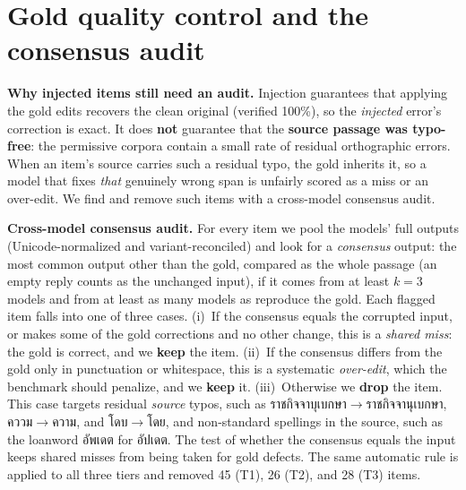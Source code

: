 \documentclass[11pt]{article}
\begin{document}
\section{Gold quality control and the consensus audit}
\label{app:qc}
\textbf{Why injected items still need an audit.} Injection guarantees that applying
the gold edits recovers the clean original (verified 100\%), so the \emph{injected} error's
correction is exact. It does \textbf{not} guarantee that the \textbf{source passage was
typo-free}: the permissive corpora contain a small rate of residual orthographic errors. When
an item's source carries such a residual typo, the gold inherits it, so a model that fixes
\emph{that} genuinely wrong span is unfairly scored as a miss or an over-edit. We find and remove
such items with a cross-model consensus audit.

\textbf{Cross-model consensus audit.} For every item we pool the models' full outputs
(Unicode-normalized and variant-reconciled) and look for a \emph{consensus} output: the most
common output other than the gold, compared as the whole passage (an empty reply counts as the unchanged input), if it comes from
at least $k{=}3$ models and from at least as many models
as reproduce the gold. Each flagged item falls into one of three cases.
(i)~If the consensus equals the corrupted input, or makes some of the gold corrections and no
other change, this is a \emph{shared miss}: the gold is correct, and we \textbf{keep} the item.
(ii)~If the consensus differs from the gold only in punctuation or whitespace, this is a
systematic \emph{over-edit}, which the benchmark should penalize, and we \textbf{keep} it.
(iii)~Otherwise we \textbf{drop} the item. This case targets residual \emph{source} typos, such
as ราชกิจจาบุเบกษา$\to$ราชกิจจานุเบกษา, คววม$\to$ความ, and โดบ$\to$โดย, and non-standard spellings in the
source, such as the loanword อัพเดต for อัปเดต. The test of whether the consensus equals the
input keeps shared misses from being taken for gold defects. The same automatic rule is applied
to all three tiers and removed 45 (T1), 26 (T2), and 28 (T3) items.
\end{document}
